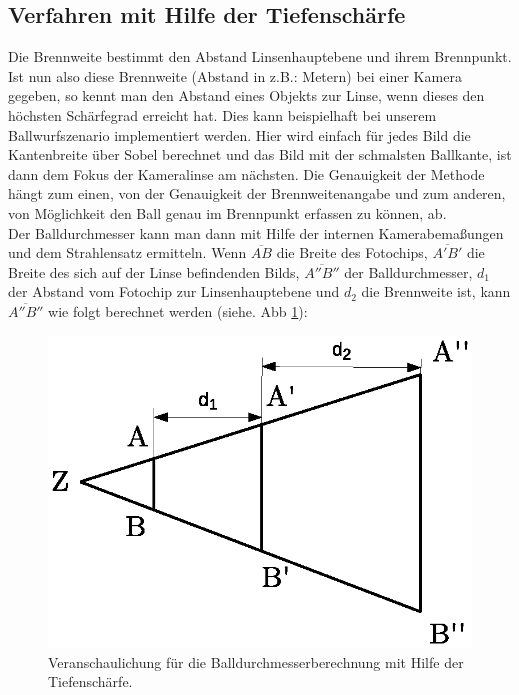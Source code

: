 \documentclass{ezb}
\begin{document}
\subsection{Verfahren mit Hilfe der Tiefenschärfe}
Die Brennweite bestimmt den Abstand Linsenhauptebene und ihrem Brennpunkt. Ist nun also diese Brennweite (Abstand in z.B.: Metern) bei einer Kamera gegeben, so kennt man den Abstand eines Objekts zur Linse, wenn dieses den höchsten Schärfegrad erreicht hat. Dies kann beispielhaft bei unserem Ballwurfszenario implementiert werden. Hier wird einfach für jedes Bild die Kantenbreite über Sobel berechnet und das Bild mit der schmalsten Ballkante, ist dann dem Fokus der Kameralinse am nächsten. Die Genauigkeit der Methode hängt zum einen, von der Genauigkeit der Brennweitenangabe und zum anderen, von Möglichkeit den Ball genau im Brennpunkt erfassen zu können, ab.\\
\linebreak
Der Balldurchmesser kann man dann mit Hilfe der internen Kamerabemaßungen und dem Strahlensatz ermitteln. Wenn $\overline{AB}$ die Breite des Fotochips, $\overline{A'B'}$ die Breite des sich auf der Linse befindenden Bilds, $\overline{A''B''}$ der Balldurchmesser, $d_{1}$ der Abstand vom Fotochip zur Linsenhauptebene und $d_{2}$ die Brennweite ist, kann $\overline{A''B''}$  wie folgt berechnet werden (siehe. Abb \ref{abb:Strahlensatz}):\\
\linebreak
\begin{figure}[!h]
\centering
\includegraphics[scale=0.6]{./Strahlensatz.eps}
\caption{Veranschaulichung für die Balldurchmesserberechnung mit Hilfe der Tiefenschärfe.}
\label{abb:Strahlensatz}
\end{figure}
\end{document}
